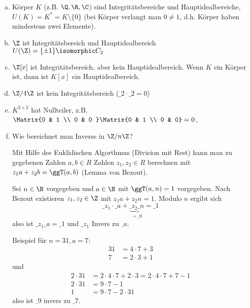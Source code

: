 \begin{ex} \label{1.2}
	\begin{enumerate}[a)]
		\item
			Körper $K$ (z.B. $\Q, \R, \C$) sind Integritätsbereiche und Hauptidealbereiche, $U(K) = K^* = K \setminus \{0\}$ (bei Körper verlangt man $0 \neq 1$, d.h. Körper haben mindestens zwei Elemente).
		\item
			$\Z$ ist Integritätsbereich und Hauptidealbereich $U(\Z) = \{ \pm 1 \} \isomorphic C_2$
		\item
			$\Z[x]$ ist Integritätsbereich, aber kein Hauptidealbereich.
			Wenn $K$ ein Körper ist, dann ist $K[x]$ ein Hauptidealbereich.
		\item
			$\Z / 4 \Z$ ist kein Integritätsbereich ($\_ 2 \cdot \_ 2 = 0$)
		\item
			$K^{2\times 2}$ hat Nullteiler, z.B. $\Matrix{0 & 1 \\ 0 & 0 } \Matrix{0 & 1 \\ 0 & 0} = 0$,
		\item
			Wie bereichnet man Inverse in $\Z / n \Z$?

			Mit Hilfe des Euklidischen Algorthmus (Division mit Rest) kann man zu gegebenen Zahlen $a,b \in R$ Zahlen $z_1, z_2 \in R$ berechnen mit $z_1 a + z_2 b = \ggT(a,b)$ (Lemma von Bezout).

			Sei $n \in \N$ vorgegeben und $a \in \N$ mit $\ggT(a, n) = 1$ vorgegeben.
			Nach Bezout existieren $z_1, z_2 \in \Z$ mit $z_1 a + z_2 n = 1$.
			Modulo $n$ ergibt sich
			\[
				\_ z_1 \cdot \_ a + \underbrace{\_ z_2 \_ n}_{=\_ 0} = \_ 1
			\]
			also ist $\_z_1 \_ a = \_ 1$ und $\_ z_1$ Invers zu $\_ a$.

			Beispiel für $n = 31, a = 7$:
			\begin{align*}
				31 &= 4 \cdot 7 + 3 \\
				7 &= 2 \cdot 3 + 1
			\end{align*}
			und
			\begin{align*}
				2 \cdot 31 &= 2 \cdot 4 \cdot 7 + 2 \cdot 3 = 2 \cdot 4 \cdot 7 + 7 - 1 \\
				2 \cdot 31 &= 9 \cdot 7 - 1 \\
				1 &= 9 \cdot 7 - 2 \cdot 31
			\end{align*}
			also ist $\_ 9$ invers zu $\_ 7$.
	\end{enumerate}
\end{ex}

